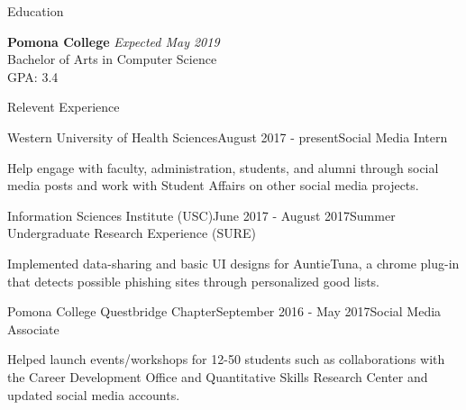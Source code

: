 \documentclass{resume} %
\begin{document}

\begin{rSection}{Education}

{\bf Pomona College} \hfill {\em Expected May 2019}
\\ Bachelor of Arts in Computer Science\\
GPA: 3.4
\end{rSection}


\begin{rSection}{Relevent Experience}

\begin{rSubsection}{Western University of Health Sciences}{August 2017 - present}{Social Media Intern}{}
 \item Help engage with faculty, administration, students, and alumni through social media posts and work with Student Affairs on other social media projects.
\end{rSubsection}

\begin{rSubsection}{Information Sciences Institute (USC)}{June 2017 - August 2017}{Summer Undergraduate Research Experience (SURE)}{}
\item Implemented data-sharing and basic UI designs for AuntieTuna, a chrome plug-in that detects possible phishing sites through personalized good lists.
\end{rSubsection}

\begin{rSubsection}{Pomona College Questbridge Chapter}{September 2016 - May 2017}{Social Media Associate}{}
\item Helped launch events/workshops for 12-50 students such as collaborations with the Career Development Office and Quantitative Skills Research Center and updated social media accounts.
\end{rSubsection}

\end{rSection}
\end{document}
